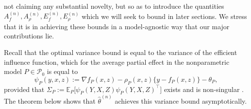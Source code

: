 \documentclass[aos]{imsart}
\newcommand{\E}{\mathbb{E}}
\begin{document}
%	
%	
	not claiming any substantial novelty, but  so as to introduce the quantities $A_f^{(n)}, A_\rho^{(n)}, E_f^{(n)}, E_\rho^{(n)}$ which we will seek to bound in later sections. We stress that it is in achieving these bounds in a model-agnostic way that our major contributions lie.
	
	Recall that the optimal variance bound is equal to the variance of the efficient influence function, which for the average partial effect in the nonparametric model $P\in\mathcal{P}_0$ is equal to
	\begin{equation*}
		\psi_P(y,x,z):=\nabla f_P(x,z) - \rho_P(x,z)\{y-f_P(x,z)\} - \theta_P,
	\end{equation*}
	provided that $\Sigma_P:=\E_P\big[\psi_P(Y,X,Z)\psi_P(Y,X,Z)^{\top}\big]$ exists and is non-singular \citep[Thm.~3.1]{NeweyEfficiency}.
	The theorem below shows that $\hat{\theta}^{(n)}$ achieves this variance bound asymptotically.
\end{document}
